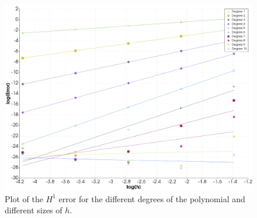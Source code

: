 \begin{figure}
    \begin{centering}
    \includegraphics[scale=0.6]{h1-fejl-plot.png}
    \caption{Plot of the $H^1$ error for the different degrees of the polynomial and different sizes of $h$.}
    \end{centering}
    \label{fig:h1-fejl-plot}
    \end{figure}